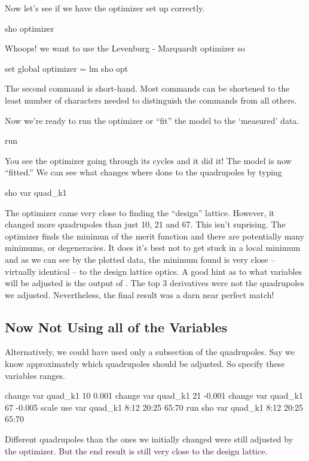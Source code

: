 Now let's see if we have the optimizer set up correctly.
\begin{example}
  sho optimizer
\end{example}
Whoops! we want to use the Levenburg - Marquardt optimizer so
\begin{example}
  set global optimizer = lm
  sho opt
\end{example}
The second command is short-hand. Most \tao commands can be shortened to the
least number of characters needed to distinguish the commands from all others.

Now we're ready to run the optimizer or ``fit'' the model to the `measured' data.
\begin{example}
  run
\end{example}
You see the optimizer going through its cycles and it did it! The model is now
``fitted.'' We can see what changes where done to the quadrupoles by typing
\begin{example}
  sho var quad\_k1
\end{example}
The optimizer came very close to finding the ``design'' lattice. However, it
changed more quadrupoles than just 10, 21 and 67. This isn't suprising. The
optimizer finds the minimun of the merit function and there are potentially many
minimums, or degeneracies.  It does it's best not to get stuck in a local
minimum and as we can see by the plotted data, the minimum found is very close
-- virtually identical -- to the design lattice optics.  A good hint as to what
variables will be adjusted is the output of .  The top 3
derivatives were not the quadrupoles we adjusted. Nevertheless, the final result
was a darn near perfect match!

\subsection{Now Not Using all of the Variables}
\label{ss:fix_it_not_all}

Alternatively, we could have used only a subsection of the quadrupoles. Say we
know approximately which quadrupoles should be adjusted. So specify these
variables ranges.
\begin{example}
  change var quad\_k1 10 0.001
  change var quad\_k1 21 -0.001
  change var quad\_k1 67 -0.005
  scale
  use var quad\_k1 8:12 20:25 65:70
  run
  sho var quad\_k1 8:12 20:25 65:70
\end{example}
Different quadrupoles than the ones we initially changed were still adjusted
by the optimizer. But the end result is still very close to the design lattice.

